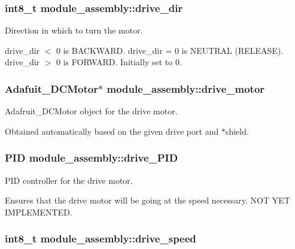 \subsubsection[{drive\+\_\+dir}]{\setlength{\rightskip}{0pt plus 5cm}int8\+\_\+t module\+\_\+assembly\+::drive\+\_\+dir}\label{structmodule__assembly_a4eaba2980fc35d71f1cc2ec15251cf15}


Direction in which to turn the motor. 

drive\+\_\+dir $<$ 0 is B\+A\+C\+K\+W\+A\+R\+D. drive\+\_\+dir = 0 is N\+E\+U\+T\+R\+A\+L (R\+E\+L\+E\+A\+S\+E). drive\+\_\+dir $>$ 0 is F\+O\+R\+W\+A\+R\+D. Initially set to 0. \hypertarget{structmodule__assembly_a1c4ce1de4be6b0d640e508245ac5f281}{}
\subsubsection[{drive\+\_\+motor}]{\setlength{\rightskip}{0pt plus 5cm}Adafuit\+\_\+\+D\+C\+Motor$\ast$ module\+\_\+assembly\+::drive\+\_\+motor}\label{structmodule__assembly_a1c4ce1de4be6b0d640e508245ac5f281}


Adafruit\+\_\+\+D\+C\+Motor object for the drive motor. 

Obtained automatically based on the given drive port and $\ast$shield. \hypertarget{structmodule__assembly_ae46a075e88844adda6fd552f87f305c0}{}
\subsubsection[{drive\+\_\+\+P\+I\+D}]{\setlength{\rightskip}{0pt plus 5cm}P\+I\+D module\+\_\+assembly\+::drive\+\_\+\+P\+I\+D}\label{structmodule__assembly_ae46a075e88844adda6fd552f87f305c0}


P\+I\+D controller for the drive motor. 

Ensures that the drive motor will be going at the speed necessary. N\+O\+T Y\+E\+T I\+M\+P\+L\+E\+M\+E\+N\+T\+E\+D. \hypertarget{structmodule__assembly_a82019a65507cc9a23d7cdcff82adc20b}{}
\subsubsection[{drive\+\_\+speed}]{\setlength{\rightskip}{0pt plus 5cm}int8\+\_\+t module\+\_\+assembly\+::drive\+\_\+speed}\label{structmodule__assembly_a82019a65507cc9a23d7cdcff82adc20b}


